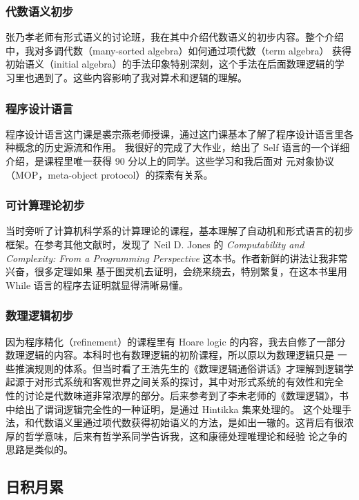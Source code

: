 \documentclass[a4paper,12pt]{article}
\numberwithin{problem}{section}
\numberwithin{definition}{section}
\numberwithin{lemma}{section}
\numberwithin{proposition}{section}
\numberwithin{theorem}{section}
\numberwithin{grammar}{section}
\numberwithin{program}{section}
\numberwithin{convention}{section}
\numberwithin{corollary}{section}
\begin{document}
\subsubsection{代数语义初步}

张乃孝老师有形式语义的讨论班，我在其中介绍代数语义的初步内容。整个介绍中，我对多调代数（many-sorted algebra）如何通过项代数（term algebra）
获得初始语义（initial algebra）的手法印象特别深刻，这个手法在后面数理逻辑的学习里也遇到了。这些内容影响了我对算术和逻辑的理解。

\subsubsection{程序设计语言}

程序设计语言这门课是裘宗燕老师授课，通过这门课基本了解了程序设计语言里各种概念的历史源流和作用。
我很好的完成了大作业，给出了 Self 语言的一个详细介绍，是课程里唯一获得 90 分以上的同学。这些学习和我后面对
元对象协议（MOP，meta-object protocol）的探索有关系。

\subsubsection{可计算理论初步}

当时旁听了计算机科学系的计算理论的课程，基本理解了自动机和形式语言的初步框架。在参考其他文献时，发现了 Neil D. Jones 的
\textit{Computability and Complexity: From a Programming Perspective} 这本书。作者新鲜的讲法让我非常兴奋，很多定理如果
基于图灵机去证明，会绕来绕去，特别繁复，在这本书里用 While 语言的程序去证明就显得清晰易懂。

\subsubsection{数理逻辑初步}

因为程序精化（refinement）的课程里有 Hoare logic 的内容，我去自修了一部分数理逻辑的内容。本科时也有数理逻辑的初阶课程，所以原以为数理逻辑只是
一些推演规则的体系。但当时看了王浩先生的《数理逻辑通俗讲话》才理解到逻辑学起源于对形式系统和客观世界之间关系的探讨，其中对形式系统的有效性和完全
性的讨论是代数味道非常浓厚的部分。后来参考到了李未老师的《数理逻辑》，书中给出了谓词逻辑完全性的一种证明，是通过 Hintikka 集来处理的。
这个处理手法，和代数语义里通过项代数获得初始语义的方法，是如出一辙的。这背后有很浓厚的哲学意味，后来有哲学系同学告诉我，这和康德处理唯理论和经验
论之争的思路是类似的。

\subsection{日积月累}
\end{document}
